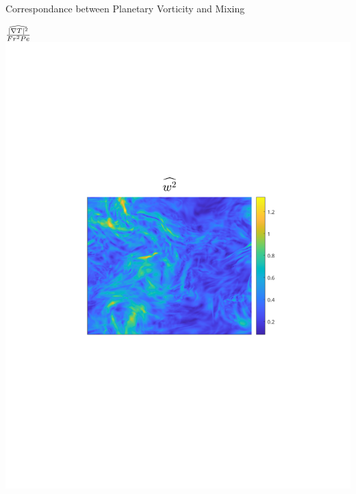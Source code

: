\documentclass[aspecttatio=169]{beamer}
\begin{document}
\begin{frame}{Correspondance between Planetary Vorticity and Mixing}
    \emp

        \centering
        {\footnotesize $\frac{\widehat{|\nabla T|^2}}{Fr^2Pe}$}
    \emp
        \centering
        \includegraphics[width=1\textwidth]{images/Om1B30_uzrms_bar.pdf}
    \emp
        \centering

\end{frame}
\end{document}

